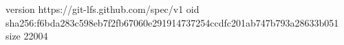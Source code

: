 version https://git-lfs.github.com/spec/v1
oid sha256:f6bda283c598eb7f2fb67060e291914737254ccdfc201ab747b793a28633b051
size 22004

